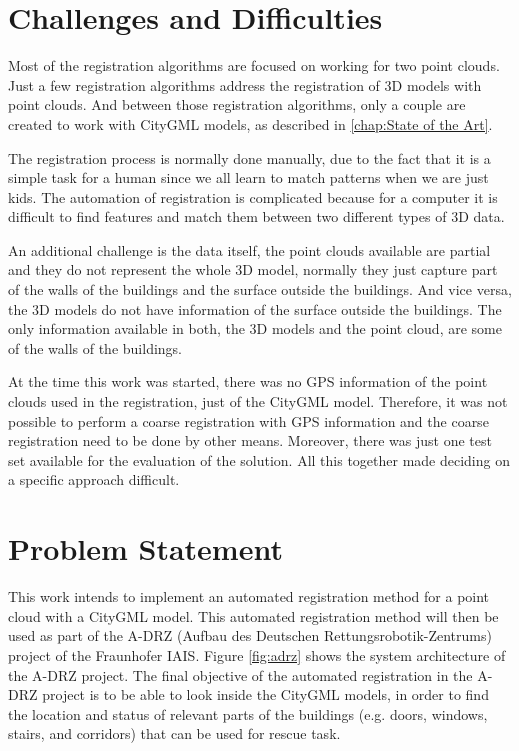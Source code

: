     \section{Challenges and Difficulties}
    
        Most of the registration algorithms are focused on working for two point clouds.
        Just a few registration algorithms address the registration of 3D models with point clouds.
        And between those registration algorithms, only a couple are created to work with CityGML models, as described in \autoref{chap:State of the Art}.
        \par      
        The registration process is normally done manually, due to the fact that it is a simple task for a human since we all learn to match patterns when we are just kids. 
        The automation of registration is complicated because for a computer it is difficult to find features and match them between two different types of 3D data.
        \par
        An additional challenge is the data itself, the point clouds available are partial and they do not represent the whole 3D model, 
        normally they just capture part of the walls of the buildings and the surface outside the buildings.
        And vice versa, the 3D models do not have information of the surface outside the buildings.
        The only information available in both, the 3D models and the point cloud, are some of the walls of the buildings.
        \par
        At the time this work was started, there was no GPS information of the point clouds used in the registration, just of the CityGML model. 
        Therefore, it was not possible to perform a coarse registration with GPS information and the coarse registration need to be done by other means.
        Moreover, there was just one test set available for the evaluation of the solution.
        All this together made deciding on a specific approach difficult.
        \par

    \section{Problem Statement}
        This work intends to implement an automated registration method for a point cloud with a CityGML model.
        This automated registration method will then be used as part of the A-DRZ (Aufbau des Deutschen Rettungsrobotik-Zentrums) project of the Fraunhofer IAIS.
        Figure \ref{fig:adrz} shows the system architecture of the A-DRZ project. 
        The final objective of the automated registration in the A-DRZ project is to be able to look inside the CityGML models, in order to 
        find the location and status of relevant parts of the buildings (e.g. doors, windows, stairs, and corridors) that can be used for rescue task.

